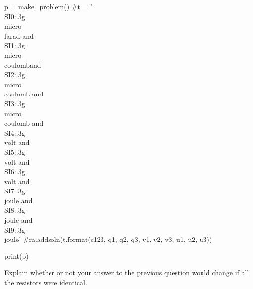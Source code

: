 \documentclass[12pt]{exam}
\begin{document}
\begin{questions}
\begin{pycode}
p = make_problem()
#t = '\\SI{{{0:.3g}}}{{\\micro\\farad}} and \\SI{{{1:.3g}}}{{\\micro\\coulomb}}and \\SI{{{2:.3g}}}{{\\micro\\coulomb}} and \\SI{{{3:.3g}}}{{\\micro\\coulomb}} and \\SI{{{4:.3g}}}{{\\volt}} and \\SI{{{5:.3g}}}{{\\volt}} and \\SI{{{6:.3g}}}{{\\volt}} and \\SI{{{7:.3g}}}{{\\joule}} and \\SI{{{8:.3g}}}{{\\joule}} and \\SI{{{9:.3g}}}{{\\joule}}'
#ra.addsoln(t.format(c123, q1, q2, q3, v1, v2, v3, u1, u2, u3))

print(p)

\end{pycode}
\question Explain whether or not your answer to the previous question would change if all the resistors were identical.
\end{questions}
	
\end{document}
